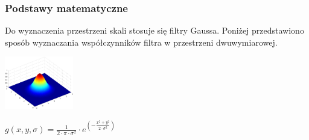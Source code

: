\begin{frame}
\frametitle{Podstawy matematyczne}
Do wyznaczenia przestrzeni skali stosuje się filtry Gaussa. Poniżej przedstawiono sposób wyznaczania współczynników filtra w przestrzeni dwuwymiarowej.

\begin{center}
\includegraphics[width=3cm]{gaussian2d.png}

$ g(x,y,\sigma)= \frac{1}{2 \cdot \pi \cdot \sigma ^ {2} }\cdot e^{(-\frac{x^{2} + y^{2}}{2 \cdot \sigma ^{2}})} $
\end{center}
\end{frame}
